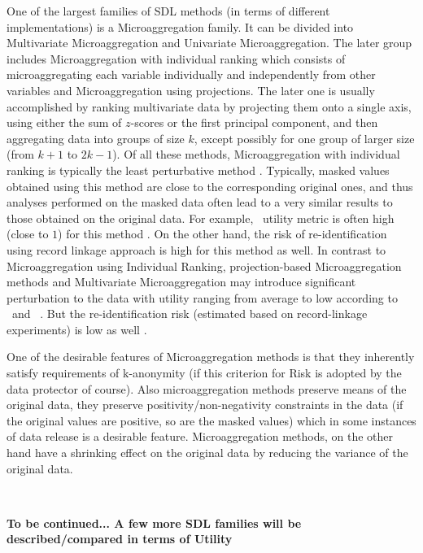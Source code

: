 \documentclass[12pt]{article}
\begin{document}
One of the largest families of SDL methods (in terms of different  implementations) is a  Microaggregation family. It can   be divided into Multivariate Microaggregation   and  Univariate Microaggregation. The later group includes Microaggregation with individual ranking which consists of microaggregating each variable individually and independently from other variables and Microaggregation using projections. The later one is usually accomplished by ranking  multivariate data by projecting them onto a single axis, using either the sum of $z$-scores or the first principal component, and then aggregating data into groups of size $k$, except possibly for one group of larger size (from $k+1$ to $2k -1$).
Of all these methods, Microaggregation with individual ranking is typically the least perturbative method \citep{kkors06}. Typically, masked values obtained using this method are close to the corresponding original ones, and thus analyses performed on the masked data often lead to a very similar results to those obtained on the original data. For example, \EO\ utility metric is often high (close to $1$)  for this method \citep{kkors06}. On the other hand, the risk of re-identification using record linkage approach is high for this method as well. 
In contrast to Microaggregation using Individual Ranking, projection-based Microaggregation methods and Multivariate Microaggregation may introduce significant perturbation to the data with utility ranging from average to low according to \IO\ and \EO\ . But the re-identification risk (estimated based on record-linkage experiments) is low as well \citep{}. 

One of the desirable features of Microaggregation methods is that they  inherently satisfy requirements of k-anonymity (if this criterion for Risk  is adopted by the data protector of course). Also microaggregation methods preserve means of the original data, they preserve positivity/non-negativity  constraints in the data (if the original values are positive, so are the masked values)  which in some instances of data release  is a desirable feature. Microaggregation methods, on the other hand have a shrinking effect on the original data by reducing  the variance of the original data.
 
 $ $ 

{\bf To be continued... A few more SDL families will be described/compared in terms of Utility}
 
%


\end{document}
